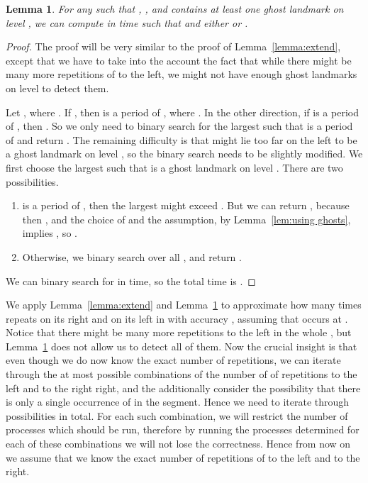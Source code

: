 \documentclass{article}[11pt,letter]
\newtheorem{lemma}[definition]{Lemma}
\begin{document}
\begin{lemma}
For any  such that , , and  contains at least one ghost landmark on level
, we can compute in  time 
such that  and either  or .
\label{lemma:extend2}
\end{lemma}

\begin{proof}
The proof will be very similar to the proof of Lemma~\ref{lemma:extend}, except that we have to take into the account the fact that while there might
be many more repetitions of  to the left, we might not have enough ghost landmarks on level  to detect them.

Let , where .
If , then  is a period of ,
where . In the other direction, if  is a period of
, then .
So we only need to binary search for the largest  such that  is a period of
 and return .
The remaining difficulty is that  might lie too far on the left to be a ghost landmark on level ,
so the binary search needs to be slightly modified.
We first choose the largest  such that  is a ghost landmark on level . There
are two possibilities.
\begin{enumerate}
\item  is a period of , then the largest
 might exceed . But we can return , because then
, and the choice of  and the assumption, by Lemma~\ref{lem:using ghosts}, implies
,
so .
\item Otherwise, we binary search over all , and return .
\end{enumerate}
We can binary search for  in  time, so the total time is .
\end{proof}

We apply Lemma~\ref{lemma:extend} and Lemma~\ref{lemma:extend2} to
approximate how many times  repeats on its right and on its left in  with accuracy ,
assuming that  occurs at .
Notice that there might be many more repetitions to the left in the whole , but Lemma~\ref{lemma:extend2} does not
allow us to detect all of them.
Now the crucial insight is that even though we do now know the exact number of repetitions, we can iterate through the at most  possible combinations of
the number of of repetitions to the left and to the right right, and the additionally consider the possibility that there is only a single
occurrence of  in the segment. Hence we need to iterate through  possibilities in total.
For each such combination, we will restrict the number of processes which should be run, therefore by running the processes
determined for each of these combinations we will not lose the correctness.
Hence from now on we assume that we know the exact number of repetitions of  to the left and to the right.
\end{document}

